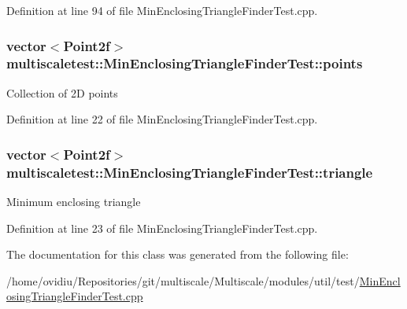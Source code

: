 \-Definition at line 94 of file \-Min\-Enclosing\-Triangle\-Finder\-Test.\-cpp.

\hypertarget{classmultiscaletest_1_1MinEnclosingTriangleFinderTest_ace108c67a933a0d79c05b304a9683764}{
\subsubsection[{points}]{\setlength{\rightskip}{0pt plus 5cm}vector$<$\-Point2f$>$ {\bf multiscaletest\-::\-Min\-Enclosing\-Triangle\-Finder\-Test\-::points}}}\label{classmultiscaletest_1_1MinEnclosingTriangleFinderTest_ace108c67a933a0d79c05b304a9683764}
\-Collection of 2\-D points 

\-Definition at line 22 of file \-Min\-Enclosing\-Triangle\-Finder\-Test.\-cpp.

\hypertarget{classmultiscaletest_1_1MinEnclosingTriangleFinderTest_a02aa9bcd10630d27293e656233e3f64e}{
\subsubsection[{triangle}]{\setlength{\rightskip}{0pt plus 5cm}vector$<$\-Point2f$>$ {\bf multiscaletest\-::\-Min\-Enclosing\-Triangle\-Finder\-Test\-::triangle}}}\label{classmultiscaletest_1_1MinEnclosingTriangleFinderTest_a02aa9bcd10630d27293e656233e3f64e}
\-Minimum enclosing triangle 

\-Definition at line 23 of file \-Min\-Enclosing\-Triangle\-Finder\-Test.\-cpp.



\-The documentation for this class was generated from the following file\-:\begin{DoxyCompactItemize}
\item 
/home/ovidiu/\-Repositories/git/multiscale/\-Multiscale/modules/util/test/\hyperlink{MinEnclosingTriangleFinderTest_8cpp}{\-Min\-Enclosing\-Triangle\-Finder\-Test.\-cpp}\end{DoxyCompactItemize}
